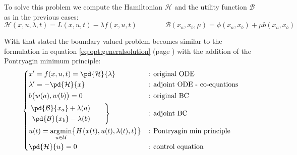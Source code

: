 	To solve this problem we compute the Hamiltonian $\mathcal H$ and the utility function $\mathcal B$ as in the previous cases:
	\[ \mathcal H (x,u, \lambda,t) = L(x,u,t) - \lambda f(x,u,t) \qquad \qquad \mathcal B (x_a,x_b,\mu) = \phi(x_a,x_b) + \mu b(x_a,x_b) \]
	
	With that stated the boundary valued problem becomes similar to the formulation in equation \ref{eq:opt:generalsolution} (page \pageref{eq:opt:generalsolution}) with the addition of the Pontryagin minimum principle:
	\begin{equation} 
		\left\{ \begin{aligned}
			& x' = f(x,u,t) = \pd{\mathcal H}{\lambda} && \textrm{: original ODE} \\
			&\lambda' = - \pd{\mathcal H}{x} && \textrm{: adjoint ODE - co-equations} \\
			&b\big(w(a),w(b)\big) = 0 && \textrm{: original BC} \\
			&\left. \begin{aligned}
				\pd{\mathcal B}{x_a} + \lambda(a) \\
				\pd{\mathcal B}{x_b} - \lambda(b)
			\end{aligned} \qquad \right\} &&\textrm{: adjoint BC} \\
			& u(t) = \underset{u \in \mathcal U}{\textrm{argmin}} \big\{ H\big(x(t), u(t),\lambda(t), t\big) \big\} && \textrm{: Pontryagin min principle} \\
			& \pd{\mathcal H}{u} = 0 && \textrm{: control equation}			
		\end{aligned} \right. 
	\end{equation}
	
	
	
